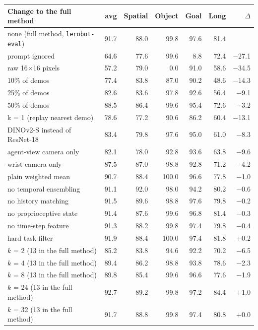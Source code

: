 \begin{tabularx}{\linewidth}{@{}X*{6}{r}@{}}
\toprule
Change to the full method & avg & Spatial & Object & Goal & Long & $\Delta$ \\
\midrule
none (full method, \texttt{lerobot-eval}) & 91.7 & 88.0 & 99.8 & 97.6 & 81.4 & \\
prompt ignored & 64.6 & 77.6 & 99.6 & 8.8 & 72.4 & −27.1 \\
raw 16$\times$16 pixels & 57.2 & 79.0 & 0.0 & 91.0 & 58.6 & −34.5 \\
10\% of demos & 77.4 & 83.8 & 87.0 & 90.2 & 48.6 & −14.3 \\
25\% of demos & 82.6 & 83.6 & 97.8 & 92.6 & 56.4 & −9.1 \\
50\% of demos & 88.5 & 86.4 & 99.6 & 95.4 & 72.6 & −3.2 \\
k = 1 (replay nearest demo) & 78.6 & 77.2 & 90.6 & 86.2 & 60.4 & −13.1 \\
DINOv2-S instead of ResNet-18 & 83.4 & 79.8 & 97.6 & 95.0 & 61.0 & −8.3 \\
agent-view camera only & 82.1 & 78.0 & 92.8 & 93.6 & 63.8 & −9.6 \\
wrist camera only & 87.5 & 87.0 & 98.8 & 92.8 & 71.2 & −4.2 \\
plain weighted mean & 90.7 & 88.4 & 100.0 & 96.6 & 77.8 & −1.0 \\
no temporal ensembling & 91.1 & 92.0 & 98.0 & 94.2 & 80.2 & −0.6 \\
no history matching & 91.5 & 89.6 & 98.8 & 97.6 & 79.8 & −0.2 \\
no proprioceptive state & 91.4 & 87.6 & 99.6 & 96.8 & 81.4 & −0.3 \\
no time-step feature & 91.3 & 88.2 & 99.8 & 97.4 & 79.8 & −0.4 \\
hard task filter & 91.9 & 88.4 & 100.0 & 97.4 & 81.8 & +0.2 \\
\midrule
$k$ = 2 (13 in the full method) & 85.2 & 83.8 & 94.6 & 92.2 & 70.2 & −6.5 \\
$k$ = 4 (13 in the full method) & 89.4 & 86.2 & 98.8 & 93.8 & 78.6 & −2.3 \\
$k$ = 8 (13 in the full method) & 89.8 & 85.4 & 99.6 & 96.6 & 77.6 & −1.9 \\
$k$ = 24 (13 in the full method) & 92.7 & 89.2 & 99.8 & 97.2 & 84.4 & +1.0 \\
$k$ = 32 (13 in the full method) & 91.7 & 88.8 & 99.8 & 97.4 & 80.8 & +0.0 \\
\bottomrule
\end{tabularx}
